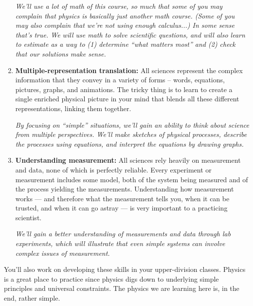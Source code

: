 \begin{enumerate}
{\it We'll use a lot of math of this course, so much that some of you may complain that physics is basically just another math course. (Some of you may also complain that we're not using enough calculus...) In some sense that's true. We will use math to solve scientific questions, and will also learn to estimate as a way to (1) determine ``what matters most'' and (2) check that our solutions make sense.}

\item {\bf Multiple-representation translation:} 
  All sciences represent the complex information that they convey in a variety of forms -- words, equations, pictures, graphs, and animations. The tricky thing is to learn to create a single enriched physical picture in your mind that blends all these different representations, linking them together.

{\it By focusing on ``simple'' situations, we'll gain an ability to think about science from multiple perspectives. We'll make sketches of physical processes, describe the processes using equations, and interpret the equations by drawing graphs.}

\item {\bf Understanding measurement:}
  All sciences rely heavily on measurement and data, none of which is perfectly reliable. Every experiment or measurement includes some model, both of the system being measured and of the process yielding the measurements. Understanding how measurement works --- and therefore what the measurement tells you, when it can be trusted, and when it can go astray --- is very important to a practicing scientist.

  {\it We'll gain a better understanding of measurements and data through lab experiments, which will illustrate that even simple systems can involve complex issues of measurement.}
  
\end{enumerate} 

You'll also work on developing these skills in your upper-division classes. Physics is a great place to practice since physics digs down to underlying simple principles and universal constraints. The physics we are learning here is, in the end, rather simple.




\clearpage
